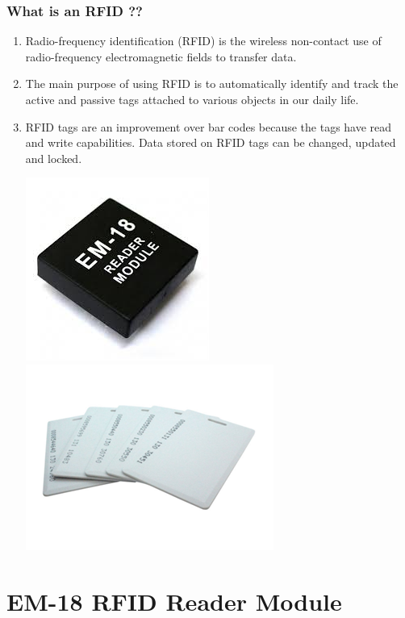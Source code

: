 \documentclass[table,10pt,red]{beamer}	%
\begin{document}
\begin{frame}
	\frametitle{What is an RFID ??}
 		\begin{enumerate}[$\checkmark$]
 				\item <+-|alert@+> Radio-frequency identification (RFID) is the wireless non-contact use of radio-frequency electromagnetic fields to transfer data. 
 				 
 				
 				\item <+-|alert@+> The main purpose of using RFID is to automatically identify and track the active and passive tags attached to various objects in our daily life.
 				
 				\item <+-|alert@+> RFID tags are an improvement over bar codes because the tags have read and write capabilities. Data stored on RFID tags can be changed, updated and locked.  
 				
 				\includegraphics[scale=0.5]{rfid1}
 			\hspace{1in}	\includegraphics[scale=0.75]{rfidtag}
 				
 		\end{enumerate}
\end{frame}

\section{EM-18 RFID Reader Module}
\end{document}
